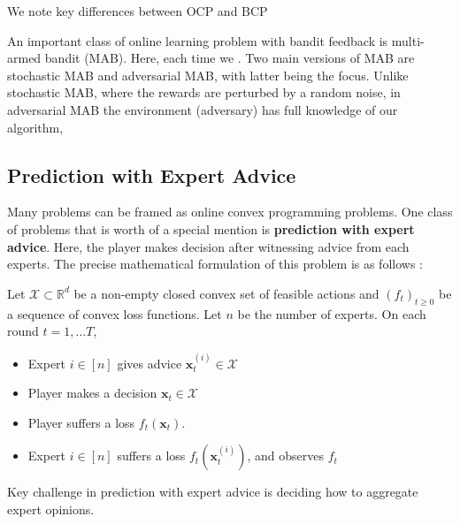 \documentclass[12pt, a4paper]{report}
\begin{document}
We note key differences between OCP and BCP

An important class of online learning problem with bandit feedback is multi-armed bandit (MAB). Here, each time we . Two main versions of MAB are stochastic MAB and adversarial MAB, with latter being the focus. Unlike stochastic MAB, where the rewards are perturbed by a random noise, in adversarial MAB the environment (adversary) has full knowledge of our algorithm, 

\subsection{Prediction with Expert Advice}
Many problems can be framed as online convex programming problems. One class of problems that is worth of a special mention is \textbf{prediction with expert advice}. Here, the player makes decision after witnessing advice from each experts. The precise mathematical formulation of this problem is as follows \cite{CesaBianchi2006PredictionLA}:
\begin{defn}
Let $\mathcal{X} \subset \mathbb{R}^d$ be a non-empty closed convex set of feasible actions and $(f_t)_{t \geq 0}$ be a sequence of convex loss functions. Let $n$ be the number of experts. On each round $t = 1, \dots T$,
\begin{itemize}
    \item Expert $i \in [n]$ gives advice $\mathbf{x}_t^{(i)} \in \mathcal{X}$
    \item Player makes a decision $\mathbf{x}_t \in \mathcal{X}$
    \item Player suffers a loss $f_t(\mathbf{x}_t)$. 
    \item Expert $i \in [n]$ suffers a loss $f_t(\mathbf{x}_t^{(i)})$, and observes $f_t$
\end{itemize}
\end{defn}

Key challenge in prediction with expert advice is deciding how to aggregate expert opinions. 
\end{document}
